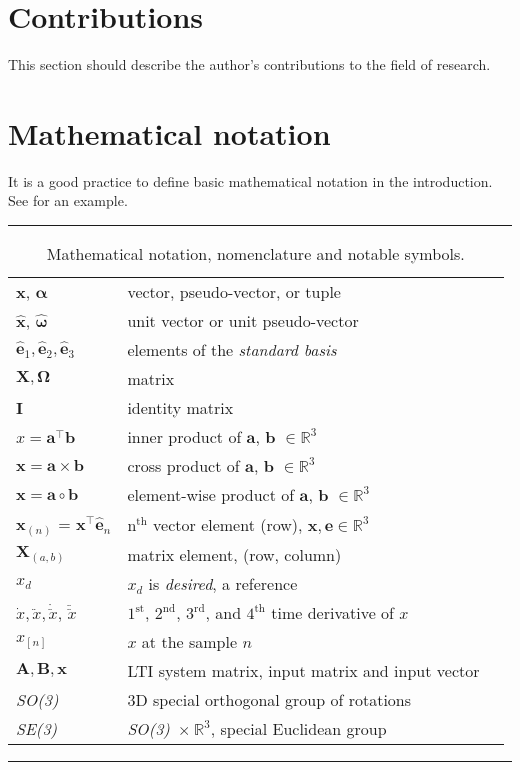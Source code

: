 \section{Contributions}

This section should describe the author's contributions to the field of research.

\section{Mathematical notation}

It is a good practice to define basic mathematical notation in the introduction.
See  for an example.

\begin{table*}[!h]
  \scriptsize
  \centering
  \noindent\rule{\textwidth}{0.5pt}
  \begin{tabular}{lll}
    $\mathbf{x}$, $\bm{\alpha}$ & vector, pseudo-vector, or tuple\\
    $\mathbf{\hat{x}}$, $\bm{\hat{\omega}}$& unit vector or unit pseudo-vector\\
    $\mathbf{\hat{e}}_1, \mathbf{\hat{e}}_2, \mathbf{\hat{e}}_3$ & elements of the \emph{standard basis} \\
    $\mathbf{X}, \bm{\Omega}$ & matrix \\
    $\mathbf{I}$ & identity matrix \\
    $x = \mathbf{a}^\intercal\mathbf{b}$ & inner product of $\mathbf{a}$, $\mathbf{b}$ $\in \mathbb{R}^3$\\
    $\mathbf{x} = \mathbf{a}\times\mathbf{b}$ & cross product of $\mathbf{a}$, $\mathbf{b}$ $\in \mathbb{R}^3$\\
    $\mathbf{x} = \mathbf{a}\circ\mathbf{b}$ & element-wise product of $\mathbf{a}$, $\mathbf{b}$ $\in \mathbb{R}^3$ \\
    $\mathbf{x}_{(n)}$ = $\mathbf{x}^\intercal\mathbf{\hat{e}}_n$ & $\mathrm{n}^{\mathrm{th}}$ vector element (row), $\mathbf{x}, \mathbf{e} \in \mathbb{R}^3$\\
    $\mathbf{X}_{(a,b)}$ & matrix element, (row, column)\\
    $x_{d}$ & $x_d$ is \emph{desired}, a reference\\
    $\dot{x}, \ddot{x}, \dot{\ddot{x}}$, $\ddot{\ddot{x}}$ & ${1^{\mathrm{st}}}$, ${2^{\mathrm{nd}}}$, ${3^{\mathrm{rd}}}$, and ${4^{\mathrm{th}}}$ time derivative of $x$\\
    $x_{[n]}$ & $x$ at the sample $n$ \\
    $\mathbf{A}, \mathbf{B}, \mathbf{x}$ & LTI system matrix, input matrix and input vector\\
    \emph{SO(3)} & 3D special orthogonal group of rotations\\
    \emph{SE(3)} & \emph{SO(3)}~$\times~\mathbb{R}^3$, special Euclidean group\\
  \end{tabular}
  \noindent\rule{\textwidth}{0.5pt}
  \caption{Mathematical notation, nomenclature and notable symbols.}
  \label{tab:mathematical_notation}
\end{table*}

